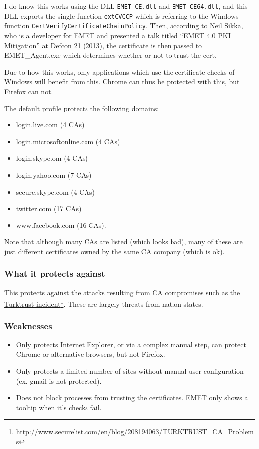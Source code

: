 \documentclass[]{article}
\newcommand{\fhref}[2]{\href{#1}{#2}\footnote{\url{#1}}}
\begin{document}
I do know this works using the DLL \texttt{EMET\_CE.dll} and
\texttt{EMET\_CE64.dll}, and this DLL exports the single function
\texttt{extCVCCP} which is referring to the Windows function
\texttt{CertVerifyCertificateChainPolicy}. Then, according to Neil
Sikka, who is a developer for EMET and presented a talk titled ``EMET
4.0 PKI Mitigation'' at Defcon 21 (2013)\cite{defcon_emet_pki}, the certificate is
then passed to EMET\_Agent.exe which determines whether or not to trust
the cert.

Due to how this works, only applications which use the certificate checks of Windows will benefit from this.  Chrome can thus be protected with this, but Firefox can not.

The default profile protects the following domains:

\begin{itemize}
  \item login.live.com (4 CAs)
  \item login.microsoftonline.com (4 CAs)
  \item login.skype.om (4 CAs)
  \item login.yahoo.com (7 CAs)
  \item secure.skype.com (4 CAs)
  \item twitter.com (17 CAs)
  \item www.facebook.com (16 CAs).
\end{itemize}

Note that although many CAs are listed (which looks bad), many of these
are just different certificates owned by the same CA company (which is
ok).


\subsubsection{What it protects against}

This protects against the attacks resulting from CA compromises such as
the
\fhref{http://www.securelist.com/en/blog/208194063/TURKTRUST_CA_Problems}{Turktrust
incident}\cite{turktrust}. These are largely threats from nation states.

\subsubsection{Weaknesses}

\begin{itemize}
  \item Only protects Internet Explorer, or via a complex manual step, can protect Chrome or alternative browsers, but not Firefox.
  \item Only protects a limited number of sites without manual user configuration (ex. gmail is not protected).
  \item Does not block processes from trusting the certificates.  EMET only shows a tooltip when it's checks fail.
\end{itemize}
\end{document}
